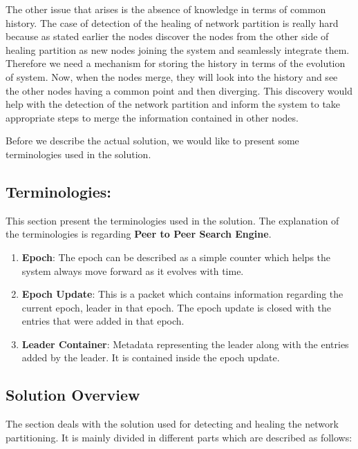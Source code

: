 \documentclass[a4paper, 11pt]{article}
\begin{document}
The other issue that arises is the absence of knowledge in terms of common history. The case of detection of the healing of network partition is really hard because as stated earlier the nodes discover the nodes from the other side of healing partition as new nodes joining the system and seamlessly integrate them. Therefore we need a mechanism for storing the history in terms of the evolution of system. Now, when the nodes merge, they will look into the history and see the other nodes having a common point and then diverging. This discovery would help with the detection of the network partition and inform the system to take appropriate steps to merge the information contained in other nodes.

Before we describe the actual solution, we would like to present some terminologies used in the solution.

\subsection{Terminologies:} 

This section present the terminologies used in the solution. The explanation of the terminologies is regarding \textbf{Peer to Peer Search Engine}. 

\begin{enumerate}

\item \textbf {Epoch}: The epoch can be described as a simple counter which helps the system always move forward as it evolves with time.

\item \textbf{Epoch Update}: This is a packet which contains information regarding the current epoch, leader in that epoch. The epoch update is closed with the entries that were added in that epoch.

\item \textbf{Leader Container}: Metadata representing the leader along with the entries added by the leader. It is contained inside the epoch update.

\end{enumerate}


\subsection{Solution Overview}

The section deals with the solution used for detecting and healing the network partitioning. It is mainly divided in different parts which are described as follows:
\end{document}
